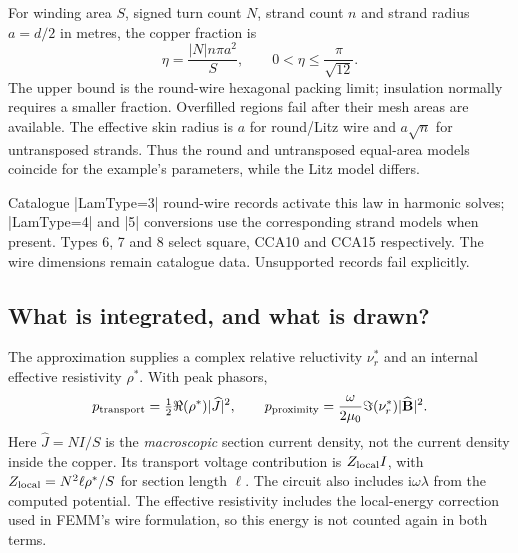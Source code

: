 For winding area $S$, signed turn count $N$, strand count $n$ and strand radius
$a=d/2$ in metres, the copper fraction is
\[
  \eta=\frac{|N|n\pi a^2}{S},\qquad
  0<\eta\leq\frac{\pi}{\sqrt{12}}.
\]
The upper bound is the round-wire hexagonal packing limit; insulation normally
requires a smaller fraction. Overfilled regions fail after their mesh areas
are available. The effective skin radius is $a$ for round/Litz wire and
$a\sqrt n$ for untransposed strands. Thus the round and untransposed equal-area
models coincide for the example's parameters, while the Litz model differs.

Catalogue |LamType=3| round-wire records activate this law in harmonic solves;
|LamType=4| and |5| conversions use the corresponding strand models when present.
Types 6, 7 and 8 select square, CCA10 and CCA15 respectively.
The wire dimensions remain catalogue data. Unsupported records fail explicitly.

\subsection{What is integrated, and what is drawn?}
\label{sec:wire-losses}
The approximation supplies a complex relative reluctivity $\nu_r^*$ and an
internal effective resistivity $\rho^*$. With peak phasors,
\[
 p_{\rm transport}=\tfrac12\Re(\rho^*)|\widehat J|^2,
 \qquad
 p_{\rm proximity}=\frac{\omega}{2\mu_0}\Im(\nu_r^*)|\widehat{\mathbf B}|^2.
\]
Here $\widehat J=NI/S$ is the \emph{macroscopic} section current density, not the
current density inside the copper. Its transport voltage contribution is
$Z_{\rm local}I$, with $Z_{\rm local}=N^2\ell\rho^*/S$ for section length $\ell$.
The circuit also includes $\mathrm i\omega\lambda$ from the computed potential.
The effective resistivity includes the local-energy correction used in FEMM's
wire formulation, so this energy is not counted again in both terms.

